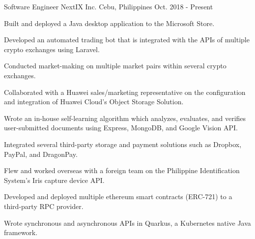 

\begin{cventries}

  \cventry
    {Software Engineer} %
    {NextIX Inc.} %
    {Cebu, Philippines} %
    {Oct. 2018 - Present} %
    {
      \begin{cvitems} %
        \item {Built and deployed a Java desktop application to the Microsoft Store.}
        \item {Developed an automated trading bot that is integrated with the APIs of multiple crypto exchanges using Laravel.}
        \item {Conducted market-making on multiple market pairs within several crypto exchanges.}
        \item {Collaborated with a Huawei sales/marketing representative on the configuration and integration of Huawei Cloud's Object Storage Solution.}
        \item {Wrote an in-house self-learning algorithm which analyzes, evaluates, and verifies user-submitted documents using Express, MongoDB, and Google Vision API.}
        \item {Integrated several third-party storage and payment solutions such as Dropbox, PayPal, and DragonPay.}
        \item {Flew and worked overseas with a foreign team on the Philippine Identification System's Iris capture device API.}
        \item {Developed and deployed multiple ethereum smart contracts (ERC-721) to a third-party RPC provider.}
        \item {Wrote synchronous and asynchronous APIs in Quarkus, a Kubernetes native Java framework.}
      \end{cvitems}
    }
\end{cventries}
